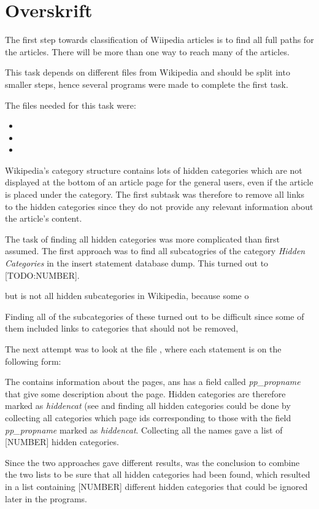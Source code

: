 \section{Overskrift}

The first step towards classification of Wiipedia articles is to find all full paths for the articles. There will be more than one way to reach many of the articles. 

\begin{code}
\end{code}

This task depends on different files from Wikipedia and should be split into smaller steps, hence several programs were made to complete the first task. 

The files needed for this task were: 
\begin{itemize}
\item \enwikicatlink
\item \enwikipage
\item \enwikipageprops
\end{itemize}




Wikipedia’s category structure contains lots of hidden categories which are not displayed at the bottom of an article page for the general users, even if the article is placed under the category. The first subtask was therefore to remove all links to the hidden categories since they do not provide any relevant information about the article's content. 

The task of finding all hidden categories was more complicated than first assumed. The first approach was to find all subcatogries of the category \emph{Hidden Categories} in the insert statement database dump. This turned out to [TODO:NUMBER]. 


but is not all hidden subcategories in Wikipedia, because some o

Finding all of the subcategories of these turned out to be difficult since some of them included links to categories that should not be removed, 
\begin{code}
\end{code}

The next attempt was to look at the file \enwikipageprops, where each statement is on the following form: 

\begin{code}
\end{code}
The \enwikipageprops  contains information about the pages, ans has a field called \emph{pp\_propname} that give some description about the page. Hidden categories are therefore marked as \emph{hiddencat} (see %
and finding all hidden categories could be done by collecting all categories which page ids corresponding to those with the field \emph{pp\_propname} marked as \emph{hiddencat}. Collecting all the names gave a list of [NUMBER] hidden categories. 

Since the two approaches gave different results, was the conclusion to combine the two lists to be sure that all hidden categories had been found, which resulted in a list containing [NUMBER] different hidden categories that could be ignored later in the programs.  

